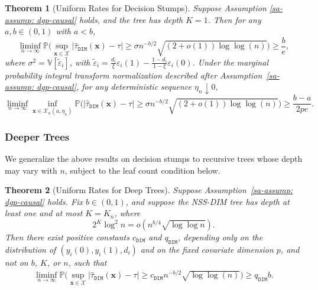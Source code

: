 \documentclass[10pt]{article}
\def\bx{\mathbf{x}}
\def\V{\mathbb{V}}
\def\DIM{\mathtt{DIM}}
\newtheorem{theorem}{Theorem}%
\theoremstyle{definition}
\theoremstyle{remark}
\begin{document}
\begin{theorem}[Uniform Rates for Decision Stumps]\label{sa-thm:rates_reg}
    Suppose Assumption \ref{sa-assump: dgp-causal} holds, and the tree has depth $K = 1$. Then for any $ a,b \in (0, 1) $ with $ a < b $, 
    \begin{equation*}
    \liminf_{n\to\infty} \mathbb{P}\Bigg(\sup_{\bx\in\mathcal{X}}|\hat\tau_{\mathtt{DIM}}(\bx) - \tau| \geq \sigma n^{-b/2}\sqrt{(2+o(1))\log\log(n)}\Bigg) \geq \frac{b}{e},
    \end{equation*}
    where $\sigma^2 = \V[\tilde{\varepsilon}_i]$, with $\tilde{\varepsilon}_i = \frac{d_i}{\xi} \varepsilon_i(1) - \frac{1 - d_i}{1 - \xi} \varepsilon_i(0)$. Under the marginal probability integral transform normalization described after Assumption~\ref{sa-assump: dgp-causal}, for any deterministic sequence $\eta_n\downarrow0$,
    \begin{equation*}
    \liminf_{n\to\infty} \inf_{\bx\in \mathcal{X}_n(a,\eta_n)} \mathbb{P}\Big(|\hat\tau_{\mathtt{DIM}}(\bx) - \tau| \geq \sigma n^{-b/2}\sqrt{(2+o(1))\log\log(n)}\Big) \geq \frac{b-a}{2 p e}.
    \end{equation*}
\end{theorem}

\subsubsection*{Deeper Trees}

We generalize the above results on decision stumps to recursive trees whose depth may vary with $n$, subject to the leaf count condition below.

\begin{theorem}[Uniform Rates for Deep Trees]\label{sa-thm: uniform minimax rates regression}
Suppose Assumption~\ref{sa-assump: dgp-causal} holds. Fix $b \in (0, 1)$, and suppose the NSS-DIM tree has depth at least one and at most $K=K_n$, where
\[
    2^K\log^2 n
    =
    o\!\left(n^{b/4}\sqrt{\log\log n}\right).
\]
Then there exist positive constants $c_{\DIM}$ and $q_{\DIM}$, depending only on the distribution of $(y_i(0),y_i(1),d_i)$ and on the fixed covariate dimension $p$, and not on $b$, $K$, or $n$, such that
\begin{align*}      
    \liminf_{n\to\infty} \mathbb{P}\Bigg(\sup_{\bx\in\mathcal{X}}|\hat\tau_{\mathtt{DIM}}(\bx) - \tau| \geq c_{\DIM} n^{-b/2}\sqrt{\log\log(n)}\Bigg) \geq q_{\DIM} b.
\end{align*}
\end{theorem}
\end{document}
